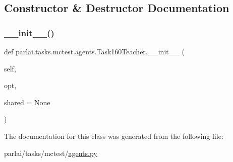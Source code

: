 \subsection{Constructor \& Destructor Documentation}
\mbox{\label{classparlai_1_1tasks_1_1mctest_1_1agents_1_1Task160Teacher_ada45ef335bc03d8fa3a410b4e9b6b282}} 
\subsubsection{\texorpdfstring{\+\_\+\+\_\+init\+\_\+\+\_\+()}{\_\_init\_\_()}}
{\footnotesize\ttfamily def parlai.\+tasks.\+mctest.\+agents.\+Task160\+Teacher.\+\_\+\+\_\+init\+\_\+\+\_\+ (\begin{DoxyParamCaption}\item[{}]{self,  }\item[{}]{opt,  }\item[{}]{shared = {\ttfamily None} }\end{DoxyParamCaption})}



The documentation for this class was generated from the following file\+:\begin{DoxyCompactItemize}
\item 
parlai/tasks/mctest/\hyperlink{parlai_2tasks_2mctest_2agents_8py}{agents.\+py}\end{DoxyCompactItemize}
